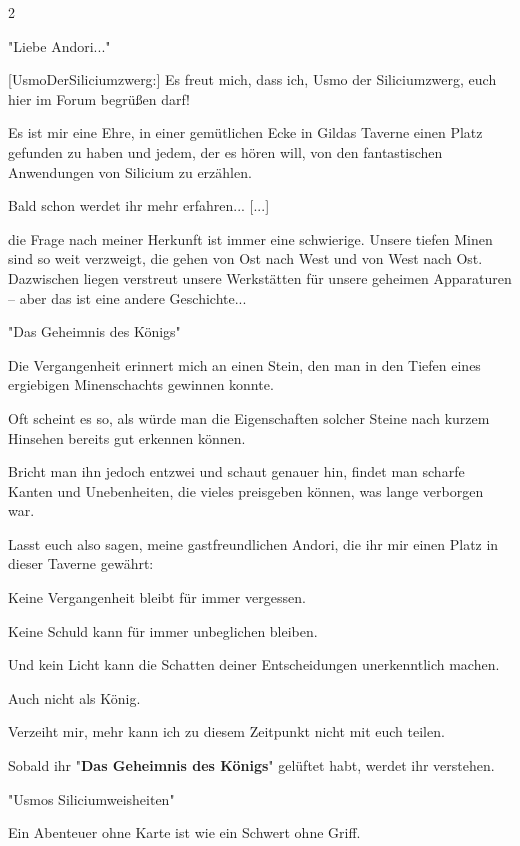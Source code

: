 \documentclass[10pt, a4paper, oneside]{book}
\begin{document}
\begin{multicols}{2}
\begin{center}
    "Liebe Andori..."
\end{center}

[UsmoDerSiliciumzwerg:] Es freut mich, dass ich, Usmo der Siliciumzwerg, euch hier im Forum begrüßen darf!

Es ist mir eine Ehre, in einer gemütlichen Ecke in Gildas Taverne einen Platz gefunden zu haben und jedem, der es hören will, von den fantastischen Anwendungen von Silicium zu erzählen.

Bald schon werdet ihr mehr erfahren... [...]

die Frage nach meiner Herkunft ist immer eine schwierige. Unsere tiefen Minen sind so weit verzweigt, die gehen von Ost nach West und von West nach Ost. Dazwischen liegen verstreut unsere Werkstätten für unsere geheimen Apparaturen – aber das ist eine andere Geschichte...


\begin{center}
    "Das Geheimnis des Königs"
\end{center}

Die Vergangenheit erinnert mich an einen Stein, den man in den Tiefen eines ergiebigen Minenschachts gewinnen konnte. 

Oft scheint es so, als würde man die Eigenschaften solcher Steine nach kurzem Hinsehen bereits gut erkennen können.

Bricht man ihn jedoch entzwei und schaut genauer hin, findet man scharfe Kanten und Unebenheiten, die vieles preisgeben können, was lange verborgen war.

Lasst euch also sagen, meine gastfreundlichen Andori, die ihr mir einen Platz in dieser Taverne gewährt:

Keine Vergangenheit bleibt für immer vergessen.

Keine Schuld kann für immer unbeglichen bleiben.

Und kein Licht kann die Schatten deiner Entscheidungen unerkenntlich machen.

Auch nicht als König.

Verzeiht mir, mehr kann ich zu diesem Zeitpunkt nicht mit euch teilen.

Sobald ihr "\textbf{Das Geheimnis des Königs}" gelüftet habt, werdet ihr verstehen.


\begin{center}
    "Usmos Siliciumweisheiten"
\end{center}

Ein Abenteuer ohne Karte ist wie ein Schwert ohne Griff.


\end{multicols}
\end{document}
